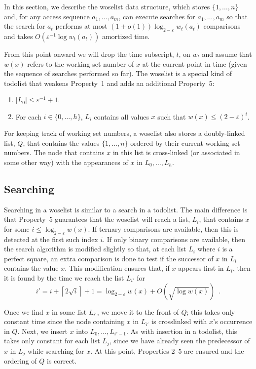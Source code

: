 \documentclass[lotsofwhite]{patmorin}
\newcommand{\eps}{\varepsilon}
\begin{document}
In this section, we describe the woselist data structure, which stores
$\{1,\ldots,n\}$ and, for any access sequence $a_1,\ldots,a_m$, can
execute searches for $a_1,\ldots,a_m$ so that the search for $a_t$
performs at most $(1+o(1))\log_{2-\eps} w_t(a_t)$ comparisons and takes
$O(\eps^{-1}\log w_t(a_t))$ amortized time.

From this point onward we will drop the time subscript, $t$, on $w_t$
and assume that $w(x)$ refers to the working set number of $x$ at the
current point in time (given the sequence of searches performed so far).
The woselist is a special kind of todolist that weakens Property~1 and
adds an additional Property~5:

\begin{enumerate}
\item $|L_0|\le \eps^{-1}+1$.
\setcounter{enumi}{4}
\item For each $i\in\{0,\ldots,h\}$, $L_i$ contains all values $x$ such that $w(x)\le (2-\eps)^i$.
\end{enumerate}

For keeping track of working set numbers, a woselist also stores a
doubly-linked list, $Q$, that contains the values $\{1,\ldots,n\}$
ordered by their current working set numbers.  The node that contains $x$
in this list is cross-linked (or associated in some other way) with the
appearances of $x$ in $L_0,\ldots,L_h$.

\subsection{Searching}

Searching in a woselist is similar to a search in a todolist.
The main
difference is that Property~5 guarantees that the woselist will reach
a list, $L_i$, that contains $x$ for some $i\le\log_{2-\eps} w(x)$.
If ternary comparisons are available, then this is detected at the
first such index $i$.  If only binary comparisons are available, then
the search algorithm is modified slightly so that, at each list $L_i$
where $i$ is a perfect square, an extra comparison is done to test if
the successor of $x$ in $L_i$ contains the value $x$.  This modification
ensures that, if $x$ appears first in $L_i$, then it is found by the
time we reach the list $L_{i'}$ for
\[
     i'=i+\left\lceil 2\sqrt{i}\right\rceil + 1 = \log_{2-\eps} w(x) + O(\sqrt{\log w(x)}) \enspace .
\]

Once we find $x$ in some list $L_{i'}$, we move it to the front of $Q$;
this takes only constant time since the node containing $x$ in $L_{i'}$
is crosslinked with $x$'s occurrence in $Q$.  Next, we insert $x$ into
$L_0,\ldots,L_{i'-1}$.  As with insertion in a todolist, this takes only
constant for each list $L_j$, since we have already seen the predecessor
of $x$ in $L_j$ while searching for $x$.  
At this point, Properties 2--5 are ensured and the ordering of $Q$ is
correct.  
\end{document}
